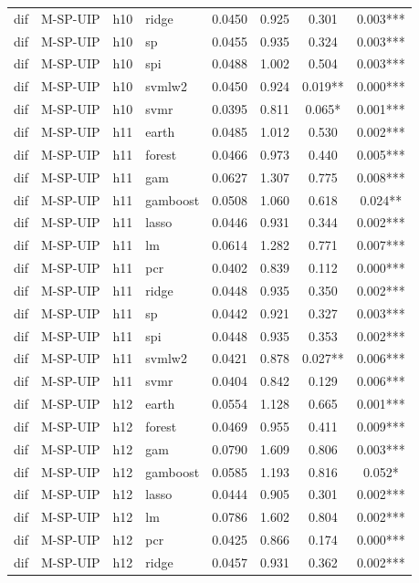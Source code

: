 \begin{ThreePartTable}
\begin{longtable}[t]{llclcccc}
dif & M-SP-UIP & h10 & ridge & 0.0450 & 0.925 & 0.301 & 0.003***\\
dif & M-SP-UIP & h10 & sp & 0.0455 & 0.935 & 0.324 & 0.003***\\
dif & M-SP-UIP & h10 & spi & 0.0488 & 1.002 & 0.504 & 0.003***\\
dif & M-SP-UIP & h10 & svmlw2 & 0.0450 & 0.924 & 0.019** & 0.000***\\
dif & M-SP-UIP & h10 & svmr & 0.0395 & 0.811 & 0.065* & 0.001***\\
\addlinespace
dif & M-SP-UIP & h11 & earth & 0.0485 & 1.012 & 0.530 & 0.002***\\
dif & M-SP-UIP & h11 & forest & 0.0466 & 0.973 & 0.440 & 0.005***\\
dif & M-SP-UIP & h11 & gam & 0.0627 & 1.307 & 0.775 & 0.008***\\
dif & M-SP-UIP & h11 & gamboost & 0.0508 & 1.060 & 0.618 & 0.024**\\
dif & M-SP-UIP & h11 & lasso & 0.0446 & 0.931 & 0.344 & 0.002***\\
dif & M-SP-UIP & h11 & lm & 0.0614 & 1.282 & 0.771 & 0.007***\\
dif & M-SP-UIP & h11 & pcr & 0.0402 & 0.839 & 0.112 & 0.000***\\
dif & M-SP-UIP & h11 & ridge & 0.0448 & 0.935 & 0.350 & 0.002***\\
dif & M-SP-UIP & h11 & sp & 0.0442 & 0.921 & 0.327 & 0.003***\\
dif & M-SP-UIP & h11 & spi & 0.0448 & 0.935 & 0.353 & 0.002***\\
dif & M-SP-UIP & h11 & svmlw2 & 0.0421 & 0.878 & 0.027** & 0.006***\\
dif & M-SP-UIP & h11 & svmr & 0.0404 & 0.842 & 0.129 & 0.006***\\
\addlinespace
dif & M-SP-UIP & h12 & earth & 0.0554 & 1.128 & 0.665 & 0.001***\\
dif & M-SP-UIP & h12 & forest & 0.0469 & 0.955 & 0.411 & 0.009***\\
dif & M-SP-UIP & h12 & gam & 0.0790 & 1.609 & 0.806 & 0.003***\\
dif & M-SP-UIP & h12 & gamboost & 0.0585 & 1.193 & 0.816 & 0.052*\\
dif & M-SP-UIP & h12 & lasso & 0.0444 & 0.905 & 0.301 & 0.002***\\
dif & M-SP-UIP & h12 & lm & 0.0786 & 1.602 & 0.804 & 0.002***\\
dif & M-SP-UIP & h12 & pcr & 0.0425 & 0.866 & 0.174 & 0.000***\\
dif & M-SP-UIP & h12 & ridge & 0.0457 & 0.931 & 0.362 & 0.002***\\

\end{longtable}
\end{ThreePartTable}
